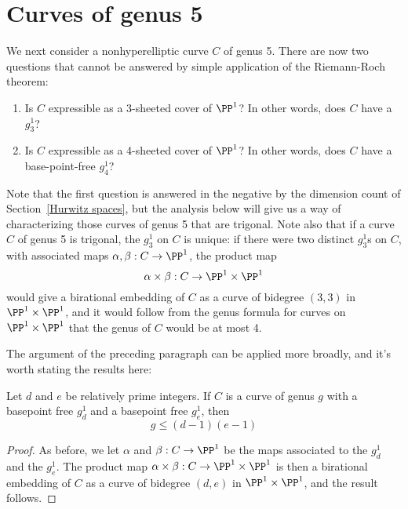 

\section{Curves of genus 5}

We next consider a nonhyperelliptic curve $C$ of genus 5. There are now two questions that cannot be answered by simple application of the Riemann-Roch theorem:

\begin{enumerate}
\item Is $C$ expressible as a 3-sheeted cover of $\PP^1$? In other words, does $C$ have a $g^1_3$?
\item Is $C$ expressible as a 4-sheeted cover of $\PP^1$? In other words, does $C$ have a base-point-free $g^1_4$?
\end{enumerate}

Note that the first question is answered in the negative by the dimension count of Section~\ref{Hurwitz spaces}, but the analysis below will give us a way of characterizing those curves of genus 5 that are trigonal. Note also that if a curve $C$ of genus 5 is trigonal, the $g^1_3$ on $C$ is unique: if there were two distinct $g^1_3$s on $C$, with associated maps $\alpha, \beta : C \to \PP^1$, the product map
$$
\alpha \times \beta : C \to \PP^1 \times \PP^1
$$
would give a birational embedding of $C$ as a curve of bidegree $(3,3)$ in $\PP^1 \times \PP^1$, and it would follow from the genus formula for curves on $\PP^1 \times \PP^1$ that the genus of $C$ would be at most 4. 

The argument of the preceding paragraph can be applied more broadly, and it's worth stating the results here:

\begin{proposition}
Let $d$ and $e$ be relatively prime integers. If $C$ is a curve of genus $g$ with a basepoint free $g^1_d$ and a basepoint free $g^1_e$, then
$$
g \leq (d-1)(e-1)
$$
\end{proposition}

\begin{proof}
As before, we let $\alpha$ and $\beta : C \to \PP^1$ be the maps associated to the $g^1_d$ and the $g^1_e$. The product map $\alpha \times \beta : C \to \PP^1 \times \PP^1$ is then a birational embedding of $C$ as a curve of bidegree $(d,e)$ in $\PP^1 \times \PP^1$, and the result follows.
\end{proof}

